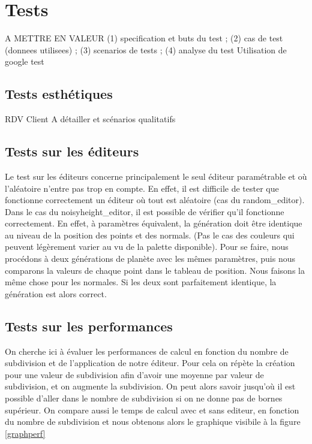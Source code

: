 \documentclass[a4paper]{article}
\begin{document}
\newpage 
\section{Tests}

 A METTRE EN VALEUR
 (1) specification et buts du test ; (2) cas de test (donnees utilisees) ; (3) scenarios de tests ; (4) analyse du test
Utilisation de google test

\subsection{Tests esthétiques}

RDV Client A détailler et scénarios qualitatifs

\subsection{Tests sur les éditeurs}

Le test sur les éditeurs concerne principalement le seul éditeur paramétrable et où l'aléatoire n'entre pas trop en compte. En effet, il est difficile de tester que fonctionne correctement un éditeur où tout est aléatoire (cas du random\_editor). Dans le cas du noisyheight\_editor, il est possible de vérifier qu'il fonctionne correctement. En effet, à paramètres équivalent, la génération doit être identique au niveau de la position des points et des normals. (Pas le cas des couleurs qui peuvent légèrement varier au vu de la palette disponible). Pour se faire, nous procédons à deux générations de planète avec les mêmes paramètres, puis nous comparons la valeurs de chaque point dans le tableau de position. Nous faisons la même chose pour les normales. Si les deux sont parfaitement identique, la génération est alors correct.

\subsection{Tests sur les performances}

On cherche ici à évaluer les performances de calcul en fonction du nombre de subdivision et de l'application de notre éditeur. Pour cela on répète la création pour une valeur de subdivision afin d'avoir une moyenne par valeur de subdivision, et on augmente la subdivision. On peut alors savoir jusqu'où il est possible d'aller dans le nombre de subdivision si on ne donne pas de bornes supérieur. On compare aussi le temps de calcul avec et sans editeur, en fonction du nombre de subdivision et nous obtenons alors le graphique visibile à la figure \ref{graphperf}
\end{document}
